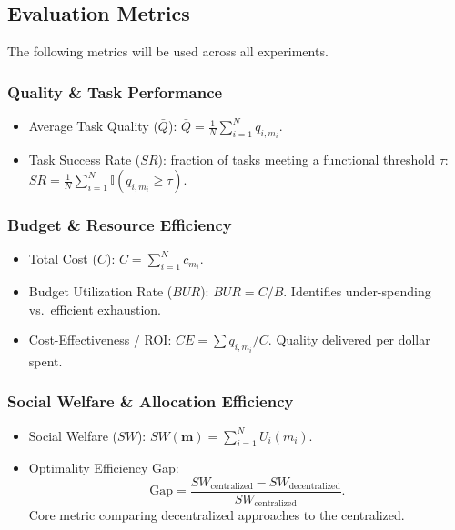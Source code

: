 \documentclass{article}
\begin{document}
\subsection{Evaluation Metrics} 
\label{sec:metrics}

The following metrics will be used across all experiments.

\subsubsection*{Quality \& Task Performance}
\begin{itemize}[leftmargin=*] 
    \item Average Task Quality ($\bar{Q}$): $\bar{Q} = \frac{1}{N} \sum_{i=1}^{N} q_{i, m_i}$. 
    \item Task Success Rate ($SR$): fraction of tasks meeting a functional threshold $\tau$: $SR = \frac{1}{N} \sum_{i=1}^{N} \mathbb{I}(q_{i, m_i} \geq \tau)$.
\end{itemize}

\subsubsection*{Budget \& Resource Efficiency}
\begin{itemize}[leftmargin=*] 
    \item Total Cost ($C$): $C = \sum_{i=1}^{N} c_{m_i}$.
    \item Budget Utilization Rate ($BUR$): $BUR = C / B$. Identifies under-spending vs.\ efficient exhaustion.
    \item Cost-Effectiveness / ROI: $CE = \sum q_{i,m_i} / C$. Quality delivered per dollar spent.
\end{itemize}

\subsubsection*{Social Welfare \& Allocation Efficiency}
\begin{itemize}[leftmargin=*] 
    \item Social Welfare ($SW$): $SW(\mathbf{m}) = \sum_{i=1}^{N} U_i(m_i)$.
    \item Optimality Efficiency Gap:
    \begin{equation} 
    \mathrm{Gap} = \frac{SW_{\mathrm{centralized}} - SW_{\mathrm{decentralized}}}{SW_{\mathrm{centralized}}}.
    \end{equation}
    Core metric comparing decentralized approaches to the centralized.
\end{itemize}
\end{document}
